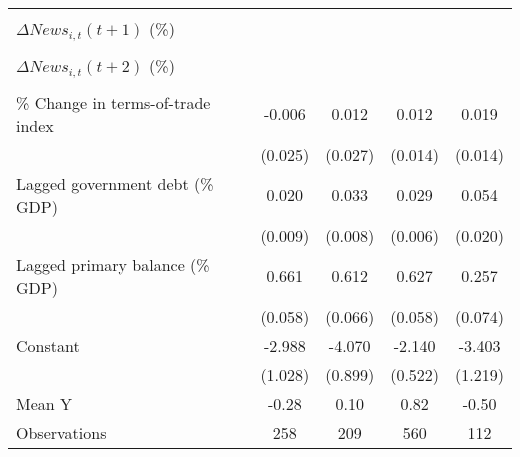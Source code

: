 {\begin{tabular}{l*{4}{c}}
                    &                     &                     &                     &                     \\
\addlinespace
$ \Delta News_{i,t}(t+1)$ (\%)&                     &                     &                     &                     \\
                    &                     &                     &                     &                     \\
\addlinespace
$ \Delta News_{i,t}(t+2)$ (\%)&                     &                     &                     &                     \\
                    &                     &                     &                     &                     \\
\addlinespace
\% Change in terms-of-trade index&      -0.006         &       0.012         &       0.012         &       0.019         \\
                    &     (0.025)         &     (0.027)         &     (0.014)         &     (0.014)         \\
\addlinespace
Lagged government debt (\% GDP)&       0.020\sym{**} &       0.033\sym{***}&       0.029\sym{***}&       0.054\sym{**} \\
                    &     (0.009)         &     (0.008)         &     (0.006)         &     (0.020)         \\
\addlinespace
Lagged primary balance (\% GDP)&       0.661\sym{***}&       0.612\sym{***}&       0.627\sym{***}&       0.257\sym{***}\\
                    &     (0.058)         &     (0.066)         &     (0.058)         &     (0.074)         \\
\addlinespace
Constant            &      -2.988\sym{**} &      -4.070\sym{***}&      -2.140\sym{***}&      -3.403\sym{**} \\
                    &     (1.028)         &     (0.899)         &     (0.522)         &     (1.219)         \\
\midrule
Mean Y              &       -0.28         &        0.10         &        0.82         &       -0.50         \\
Observations        &         258         &         209         &         560         &         112         \\
\bottomrule
\end{tabular}
}
